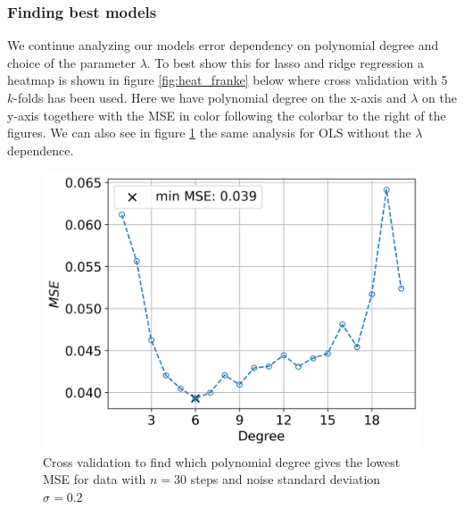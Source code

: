 \documentclass[12pt]{article}
\begin{document}
\subsubsection{Finding best models}
We continue analyzing our models error dependency on polynomial degree and choice of the parameter $\lambda$. To best show this for lasso and ridge regression a heatmap is shown in figure \ref{fig:heat_franke} below where cross validation with 5 $k$-folds has been used. Here we have polynomial degree on the x-axis and $\lambda$ on the y-axis togethere with the MSE in color following the colorbar to the right of the figures. We can also see in figure \ref{fig:best_OLS} the same analysis for OLS without the $\lambda$ dependence.
\begin{figure}[H]
  \centering
  \includegraphics[width=.7\textwidth]{../figures/best_lambda_OLS_02_franke.png}
  \caption{Cross validation to find which polynomial degree gives the lowest MSE for data with $n=30$ steps and noise standard deviation $\sigma=0.2$}
  \label{fig:best_OLS}
\end{figure}
\end{document}
